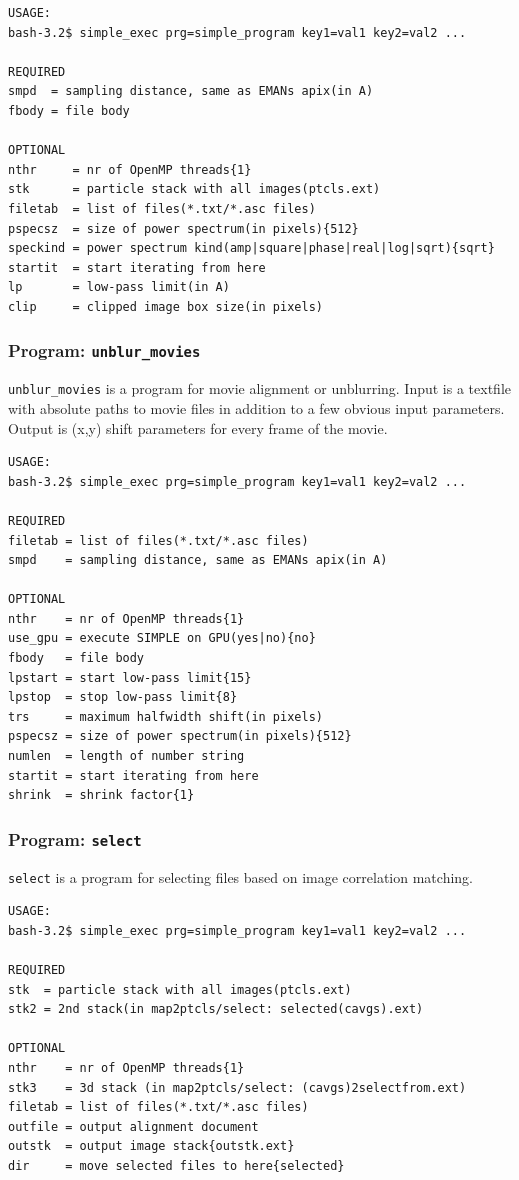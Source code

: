 \documentclass[a4paper,11pt]{article}
\newcommand{\prgname}[1]{\textcolor{NavyBlue}{\texttt{#1}}}
\begin{document}
\begin{verbatim}
USAGE:
bash-3.2$ simple_exec prg=simple_program key1=val1 key2=val2 ...

REQUIRED
smpd  = sampling distance, same as EMANs apix(in A)
fbody = file body

OPTIONAL
nthr     = nr of OpenMP threads{1}
stk      = particle stack with all images(ptcls.ext)
filetab  = list of files(*.txt/*.asc files)
pspecsz  = size of power spectrum(in pixels){512}
speckind = power spectrum kind(amp|square|phase|real|log|sqrt){sqrt}
startit  = start iterating from here
lp       = low-pass limit(in A)
clip     = clipped image box size(in pixels)
\end{verbatim}

\subsubsection{Program: \prgname{unblur\_movies}}
\label{unblur_movies}
\prgname{unblur\_movies} is a program for movie alignment or unblurring. Input is a textfile with absolute paths to movie files in addition to a few obvious input parameters. Output is (x,y) shift parameters for every frame of the movie.

\begin{verbatim}
USAGE:
bash-3.2$ simple_exec prg=simple_program key1=val1 key2=val2 ...

REQUIRED
filetab = list of files(*.txt/*.asc files)
smpd    = sampling distance, same as EMANs apix(in A)

OPTIONAL
nthr    = nr of OpenMP threads{1}
use_gpu = execute SIMPLE on GPU(yes|no){no}
fbody   = file body
lpstart = start low-pass limit{15}
lpstop  = stop low-pass limit{8}
trs     = maximum halfwidth shift(in pixels)
pspecsz = size of power spectrum(in pixels){512}
numlen  = length of number string
startit = start iterating from here
shrink  = shrink factor{1}
\end{verbatim}

\subsubsection{Program: \prgname{select}}
\label{select}
\prgname{select} is a program for selecting files based on image correlation matching.

\begin{verbatim}
USAGE:
bash-3.2$ simple_exec prg=simple_program key1=val1 key2=val2 ...

REQUIRED
stk  = particle stack with all images(ptcls.ext)
stk2 = 2nd stack(in map2ptcls/select: selected(cavgs).ext)

OPTIONAL
nthr    = nr of OpenMP threads{1}
stk3    = 3d stack (in map2ptcls/select: (cavgs)2selectfrom.ext)
filetab = list of files(*.txt/*.asc files)
outfile = output alignment document
outstk  = output image stack{outstk.ext}
dir     = move selected files to here{selected}
\end{verbatim}
\end{document}

